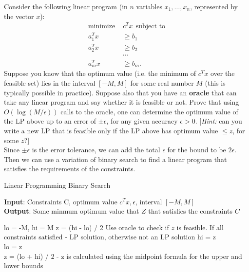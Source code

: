 \documentclass[addpoints, 11pt]{exam}
\begin{document}
\begin{questions}
  Consider the following linear program (in $n$ variables $x_1, \dots, x_n$, represented by the vector $x$):
  \begin{align*}
    \text{minimize } & c^T x ~~\text{subject to} \\
    a_1^T x          & \ge b_1                   \\
    a_2^T x          & \ge b_2                   \\
                     & \cdots                    \\
    a_m^T x          & \ge b_m.
  \end{align*}
  Suppose you know that the optimum value (i.e. the minimum of $c^T x$ over the feasible set) lies in the interval $[-M, M]$ for some real number $M$ (this is typically possible in practice).  Suppose also that you have an {\bf oracle} that can take any linear program and say whether it is feasible or not.  Prove that using $O(\log (M/\epsilon))$ calls to the oracle, one can determine the optimum value of the LP above up to an error of $\pm \epsilon$, for any given accuracy $\epsilon > 0$.  [\emph{Hint: } can you write a new LP that is feasible only if the LP above has optimum value $\le z$, for some $z$?] \\
  Since $\pm \epsilon$ is the error tolerance, we can add the total $\epsilon$ for the bound to be $2\epsilon$. Then we can use a variation of binary search to find a linear program
  that satisfies the requirements of the constraints.

  \begin{algorithm}
    \caption{Linear Programming Binary Search }
    \hspace*{\algorithmicindent} \textbf{Input}: Constraints C, optimum value $c^{T}x, \epsilon$, interval $[-M, M]$\\
    \hspace*{\algorithmicindent} \textbf{Output}: Some minmum optimum value that $Z$ that satisfies the constraints $C$
    \begin{algorithmic}[1]
      \State lo = -M, hi = M
      \State z = (hi - lo) / 2
      \State Use oracle to check if $z$ is feasible. If all constraints satisfied - LP solution, otherwise not an LP solution
      hi = z
      \Else \\
      lo = z
      \EndIf
      \EndWhile \\
      \Return z = (lo + hi) / 2 - z is calculated using the midpoint formula for the upper and lower bounds
    \end{algorithmic}
  \end{algorithm}


\end{questions}
\end{document}
